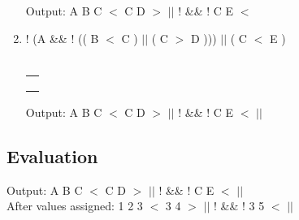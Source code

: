 \documentclass[a4paper]{article}
\begin{document}
\begin{large}
\begin{enumerate}
\begin{tabular}[t]{ | p{1.6em} | }
            \makecell{$||$} \\ \hline
          \end{tabular}
          \hspace{2em}
          Output: A B C $<$ C D $>$ $||$ ! \&\& ! C E $<$
    \item
          ! (A \&\& ! (( B $<$ C ) $||$ ( C $>$ D ))) $||$ ( C $<$ E ) \\
          \\
          \begin{tabular}[t]{ | p{1.6em} | }
            \makecell{} \\ \hline
            \makecell{} \\ \hline
            \makecell{} \\ \hline
            \makecell{} \\ \hline
          \end{tabular}
          \hspace{2em}
          Output: A B C $<$ C D $>$ $||$ ! \&\& ! C E $<$ $||$
  \end{enumerate}

  \newpage

  \subsection*{Evaluation}

  Output: A B C $<$ C D $>$ $||$ ! \&\& ! C E $<$ $||$\\
  After values assigned: 1 2 3 $<$ 3 4 $>$ $||$ ! \&\& ! 3 5 $<$ $||$


\end{large}
\end{document}
